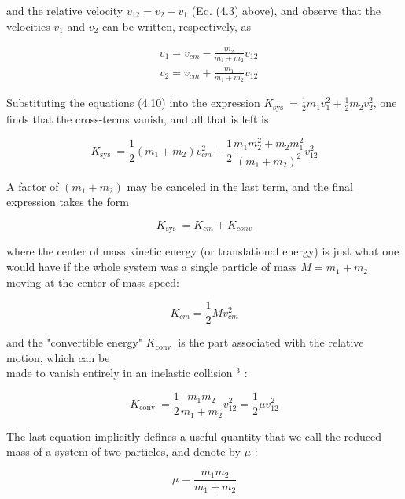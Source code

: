 \documentclass[10pt]{article}
\begin{document}
and the relative velocity $v_{12}=v_{2}-v_{1}$ (Eq. (4.3) above), and observe that the velocities $v_{1}$ and $v_{2}$ can be written, respectively, as


\begin{align*}
& v_{1}=v_{c m}-\frac{m_{2}}{m_{1}+m_{2}} v_{12} \\
& v_{2}=v_{c m}+\frac{m_{1}}{m_{1}+m_{2}} v_{12} \tag{4.10}
\end{align*}


Substituting the equations (4.10) into the expression $K_{\text {sys }}=\frac{1}{2} m_{1} v_{1}^{2}+\frac{1}{2} m_{2} v_{2}^{2}$, one finds that the cross-terms vanish, and all that is left is

$$
K_{\text {sys }}=\frac{1}{2}\left(m_{1}+m_{2}\right) v_{c m}^{2}+\frac{1}{2} \frac{m_{1} m_{2}^{2}+m_{2} m_{1}^{2}}{\left(m_{1}+m_{2}\right)^{2}} v_{12}^{2}
$$

A factor of $\left(m_{1}+m_{2}\right)$ may be canceled in the last term, and the final expression takes the form


\begin{equation*}
K_{\text {sys }}=K_{c m}+K_{c o n v} \tag{4.11}
\end{equation*}


where the center of mass kinetic energy (or translational energy) is just what one would have if the whole system was a single particle of mass $M=m_{1}+m_{2}$ moving at the center of mass speed:


\begin{equation*}
K_{c m}=\frac{1}{2} M v_{c m}^{2} \tag{4.12}
\end{equation*}


and the "convertible energy" $K_{\text {conv }}$ is the part associated with the relative motion, which can be\\
made to vanish entirely in an inelastic collision ${ }^{3}$ :


\begin{equation*}
K_{\text {conv }}=\frac{1}{2} \frac{m_{1} m_{2}}{m_{1}+m_{2}} v_{12}^{2}=\frac{1}{2} \mu v_{12}^{2} \tag{4.13}
\end{equation*}


The last equation implicitly defines a useful quantity that we call the reduced mass of a system of two particles, and denote by $\mu$ :


\begin{equation*}
\mu=\frac{m_{1} m_{2}}{m_{1}+m_{2}} \tag{4.14}
\end{equation*}
\end{document}
